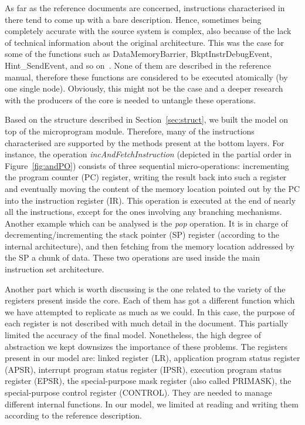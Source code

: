 \documentclass[conference]{IEEEtran}
\begin{document}
As far as the reference documents are concerned, instructions characterised in there tend to
come up with a bare description. Hence, sometimes being completely accurate with 
the source system is complex, also because of the lack of technical information about the
original architecture. This was the case for some of the functions such as DataMemoryBarrier,
BkptInstrDebugEvent, Hint\_SendEvent, and so on~\cite{armManual}.
None of them are described in the reference manual, therefore these
functions are considered to be executed atomically (by one single node). Obviously, this
might not be the case and a deeper research with the producers of the core is needed to
untangle these operations.

Based on the structure described in Section~\ref{sec:struct}, we built the model on top of
the microprogram module. Therefore, many of the instructions characterised are supported by
the methods present at the bottom layers. For instance, the operation
\textit{incAndFetchInstruction} (depicted in the partial order in Figure~\ref{fig:andPO})
consists of three sequential micro-operations: incrementing the program counter (PC)
register, writing the result back into such a register and eventually moving the content of
the memory location pointed out by the PC into the instruction register (IR). This operation is
executed at the end of nearly all the instructions, except for the ones involving any branching
mechanisms. Another example which can be analysed is the \textit{pop} operation. It is in charge of
decrementing/incrementing the stack pointer (SP) register (according to the internal
architecture), and then fetching from the memory location addressed by the SP a chunk of 
data. These two operations are used inside the main instruction set architecture.

Another part which is worth discussing is the one related to the variety of the
registers present inside the core. Each of them has got a different function which we have
attempted to replicate as much as we could. In this case, the purpose of each register
is not described with much detail in the document. This partially limited the accuracy of the
final model. Nonetheless, the high degree of abstraction we kept downsizes the importance of
these problems. The registers present in our model are: linked register (LR), application
program status register (APSR), interrupt program status register (IPSR), execution program
status register (EPSR), the special-purpose mask register (also called PRIMASK), the 
special-purpose control register (CONTROL). They are needed to manage different internal
functions. In our model, we limited at reading and writing them according to the reference
description.
\end{document}

